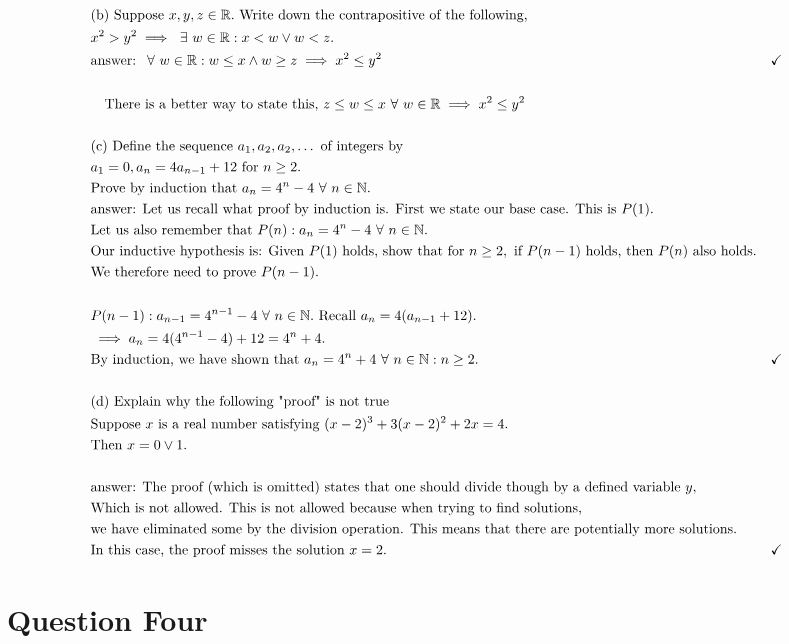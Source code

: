 \documentclass{article}
\begin{document}
        \begin{align*}
            &\\
            &\text{(b) Suppose }x, y, z \in \mathbb{R}. \text{ Write down the contrapositive of the following,}\\
            &x^2 > y^2 \implies ~\exists~ w\in\mathbb{R}: x < w \lor w < z.\\
            &\text{answer: }~\forall~ w \in \mathbb{R} : w \leq x \land w \geq z \implies x^2 \leq y^2&\checkmark\\
            &\\
            &\quad\text{There is a better way to state this, }z \leq w \leq x ~\forall~ w \in \mathbb{R} \implies x^2 \leq y^2 \\
            &\\
            &\text{(c) Define the sequence }a_1, a_2, a_2, \dots\text{ of integers by }\\
            &a_1 = 0, a_n = 4a_{n-1} + 12 \text{ for } n \geq 2.\\
            &\text{Prove by induction that }a_n = 4^n - 4 ~\forall~ n \in \mathbb{N}.\\
            &\text{answer: Let us recall what proof by induction is. First we state our base case. This is }P(1).\\
            &\text{Let us also remember that }P(n): a_n = 4^n - 4 ~\forall~ n\in\mathbb{N}.\\
            &\text{Our inductive hypothesis is: Given }P(1)\text{ holds, show that for }n \geq 2, \text{ if }P(n-1) \text{ holds, then } P(n) \text{ also holds.}\\
            &\text{We therefore need to prove }P(n-1).\\
            &\\
            &P(n-1): a_{n-1} = 4^{n-1} - 4 ~\forall~ n\in \mathbb{N}. \text{ Recall } a_n = 4(a_{n-1} + 12).\\
            &\implies a_n = 4(4^{n-1} - 4) + 12 = 4^n + 4.\\
            &\text{By induction, we have shown that }a_n = 4^n + 4~\forall~ n\in \mathbb{N} : n \geq 2. &\checkmark\\
            &\\
            &\text{(d) Explain why the following "proof" is not true}\\
            &\text{Suppose }x \text{ is a real number satisfying } (x-2)^3 + 3(x-2)^2 + 2x = 4.\\
            &\text{Then }x = 0 \lor 1.\\
            &\\
            &\text{answer: The proof (which is omitted) states that one should divide though by a defined variable }y,\\
            &\text{Which is not allowed. This is not allowed because when trying to find solutions,}\\
            &\text{we have eliminated some by the division operation. This means that there are potentially more solutions.}\\
            &\text{In this case, the proof misses the solution }x = 2. &\checkmark\\
        \end{align*}

    \section{Question Four}
        \begin{align*}
            &\\
        \end{align*}
\end{document}
